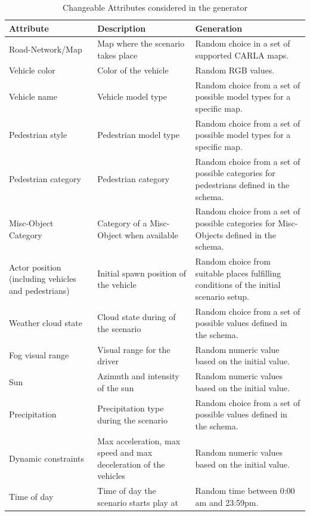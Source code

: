 \documentclass[conference, a4paper, 11pt]{IEEEtran}
\begin{document}
\begin{table}
	\renewcommand{\arraystretch}{1.2}
	\caption{Changeable Attributes considered in the generator}
	\label{attribute_table}
	\centering
	\begin{tabularx}{\linewidth}{p{2cm}|p{2cm}|p{3.5cm}}
		\hline
		\bfseries Attribute & \bfseries Description & \bfseries Generation \\
		\hline\hline
		Road-Network/Map & Map where the scenario takes place & Random choice in a set of supported CARLA maps.  \\ \hline
		Vehicle color  & Color of the vehicle & Random RGB values. \\ \hline
		Vehicle name & Vehicle model type & Random choice from  a set of possible model types for a specific map. \\ \hline
		Pedestrian style & Pedestrian model type & Random choice from  a set of possible model types for a specific map. \\ \hline
		Pedestrian category & Pedestrian category & Random choice from a set of possible categories for pedestrians defined in the schema. \\ \hline
		Misc-Object Category & Category of a Misc-Object when available & Random choice from a set of possible categories for Misc-Objects defined in the schema. \\ \hline
		Actor position (including vehicles and pedestrians) & Initial spawn position of the vehicle & Random choice from suitable places fulfilling conditions of the initial scenario setup. \\ \hline
		Weather cloud state & Cloud state during of the scenario & Random choice from a set of possible values defined in the schema. \\ \hline
		Fog visual range & Visual range for the driver & Random numeric value based on the initial value. \\ \hline
		Sun & Azimuth and intensity of the sun & Random numeric values based on the initial value. \\ \hline
		Precipitation & Precipitation type during the scenario & Random choice from a set of possible values defined in the schema. \\ \hline
		Dynamic constraints & Max acceleration, max speed and max deceleration of the vehicles  & Random numeric values based on the initial value. \\ \hline
		Time of day & Time of day the scenario starts play at & Random time between 0:00 am and 23:59pm. \\ \hline
	\end{tabularx}
\end{table}
\end{document}
